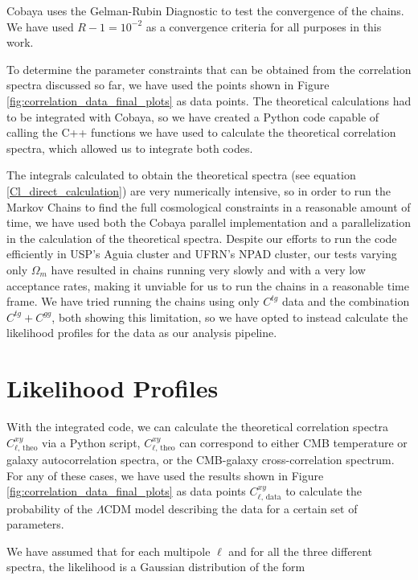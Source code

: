 \documentclass[openany,a4paper,12pt,oneside]{book}
\begin{document}
\begin{spacing}{1.5}
Cobaya uses the Gelman-Rubin Diagnostic \cite{Rminus1_paper92} to test the convergence of the chains. We have used $R-1=10^{-2}$ as a convergence criteria for all purposes in this work.

To determine the parameter constraints that can be obtained from the correlation spectra discussed so far, we have used the points shown in Figure \ref{fig:correlation_data_final_plots} as data points. The theoretical calculations had to be integrated with Cobaya, so we have created a Python code capable of calling the C++ functions we have used to calculate the theoretical correlation spectra, which allowed us to integrate both codes. 

The integrals calculated to obtain the theoretical spectra (see equation \eqref{Cl_direct_calculation}) are very numerically intensive, so in order to run the Markov Chains to find the full cosmological constraints in a reasonable amount of time, we have used both the Cobaya parallel implementation and a parallelization in the calculation of the theoretical spectra. Despite our efforts to run the code efficiently in USP's Aguia cluster and UFRN's NPAD cluster, our tests varying only $\Omega_m$ have resulted in chains running very slowly and with a very low acceptance rates, making it unviable for us to run the chains in a reasonable time frame. We have tried running the chains using only $C^{tg}$ data and the combination $C^{tg}+C^{gg}$, both showing this limitation, so we have opted to instead calculate the likelihood profiles for the data as our analysis pipeline.

\section{Likelihood Profiles}

With the integrated code, we can calculate the theoretical correlation spectra $C_{\ell\text{, theo}}^{xy}$ via a Python script, $C_{\ell\text{, theo}}^{xy}$ can correspond to either CMB temperature or galaxy autocorrelation spectra, or the CMB-galaxy cross-correlation spectrum. For any of these cases, we have used the results shown in Figure \ref{fig:correlation_data_final_plots} as data points $C_{\ell\text{, data}}^{xy}$ to calculate the probability of the $\Lambda$CDM model describing the data for a certain set of parameters. 

We have assumed that for each multipole $\ell$ and for all the three different spectra, the likelihood is a Gaussian distribution of the form


\end{spacing}
\end{document}
